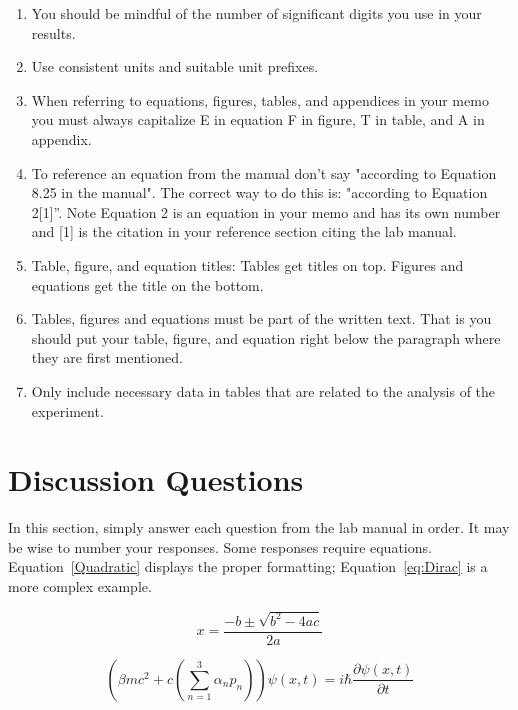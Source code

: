 \documentclass[11pt,a4paper]{article}
\begin{document}
\begin{enumerate} %
  \item You should be mindful of the number of significant digits you use in your results.
  \item Use consistent units and suitable unit prefixes.
  \item When referring to equations, figures, tables, and appendices in your memo you must always capitalize E in equation F in figure, T in table, and A in appendix.
  \item To reference an equation from the manual don't say "according to Equation 8.25 in the manual". The correct way to do this is: "according to Equation 2[1]”. Note Equation 2 is an equation in your memo and has its own number and [1] is the citation in your reference section citing the lab manual.
  \item Table, figure, and equation titles: Tables get titles on top. Figures and equations get the title on the bottom.
  \item Tables, figures and equations must be part of the written text. That is you should put your table, figure, and equation right below the paragraph where they are first mentioned.
  \item Only include necessary data in tables that are related to the analysis of the experiment.
\end{enumerate}

\section*{Discussion Questions}
In this section, simply answer each question from the lab manual in order. It may be wise to number your responses. Some responses require equations. Equation~\eqref{Quadratic} displays the proper formatting; Equation~\eqref{eq:Dirac} is a more complex example.

\begin{equation}
\label{Quadratic}
x=\frac{-b\pm\sqrt{b^2-4ac}}{2a}
\end{equation}

	
\begin{equation}
\label{eq:Dirac}
\left (
    \beta mc^2 + c 
       \left ( 
           \sum_{n=1}^3 \alpha_n p_n 
       \right )
\right )
\psi(x,t)
=
i \hbar \dfrac{\partial \psi(x,t) }{\partial t}
\end{equation}


\end{document}
